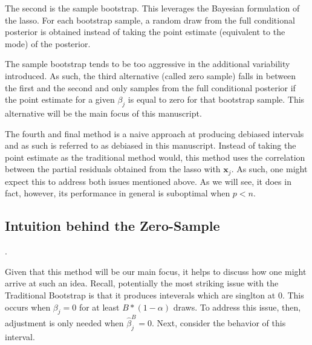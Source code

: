 The second is the sample bootstrap. This leverages the Bayesian formulation of the lasso. For each bootstrap sample, a random draw from the full conditional posterior is obtained instead of taking the point estimate (equivalent to the mode) of the posterior.

The sample bootstrap tends to be too aggressive in the additional variability introduced. As such, the third alternative (called zero sample) falls in between the first and the second and only samples from the full conditional posterior if the point estimate for a given $\beta_j$ is equal to zero for that bootstrap sample. This alternative will be the main focus of this manuscript.

The fourth and final method is a naive approach at producing debiased intervals and as such is referred to as debiased in this manuscript. Instead of taking the point estimate as the traditional method would, this method uses the correlation between the partial residuals obtained from the lasso with $\boldsymbol{x}_j$. As such, one might expect this to address both issues mentioned above. As we will see, it does in fact, however, its performance in general is suboptimal when $p < n$.


\subsection{Intuition behind the Zero-Sample}

.

Given that this method will be our main focus, it helps to discuss how one might arrive at such an idea. Recall, potentially the most striking issue with the Traditional Bootstrap is that it produces inteverals which are singlton at 0. This occurs when $\beta_j = 0$ for at least $B * (1 - \alpha)$ draws. To address this issue, then, adjustment is only needed when $\hat{\beta}_j^{B} = 0$. Next, consider the behavior of this interval.

